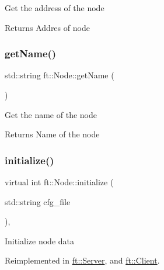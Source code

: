 Get the address of the node

\begin{DoxyReturn}{Returns}
Addres of node 
\end{DoxyReturn}
\mbox{\label{classft_1_1Node_af62312cc4d5a05c859034b10b1a1af64}} 
\subsubsection{\texorpdfstring{get\+Name()}{getName()}}
{\footnotesize\ttfamily std\+::string ft\+::\+Node\+::get\+Name (\begin{DoxyParamCaption}{ }\end{DoxyParamCaption})\hspace{0.3cm}{\ttfamily [inline]}}

Get the name of the node

\begin{DoxyReturn}{Returns}
Name of the node 
\end{DoxyReturn}
\mbox{\label{classft_1_1Node_addc92fd2c5cae12a8ea68c30b7202e91}} 
\subsubsection{\texorpdfstring{initialize()}{initialize()}}
{\footnotesize\ttfamily virtual int ft\+::\+Node\+::initialize (\begin{DoxyParamCaption}\item[{std\+::string}]{cfg\+\_\+file }\end{DoxyParamCaption})\hspace{0.3cm}{\ttfamily [inline]}, {\ttfamily [virtual]}}

Initialize node data 

Reimplemented in \mbox{\hyperlink{classft_1_1Server_a834002a833999b593d357b72ef69ddcf}{ft\+::\+Server}}, and \mbox{\hyperlink{classft_1_1Client_a063db70469c9f2715bbad637d0353680}{ft\+::\+Client}}.

\mbox{\label{classft_1_1Node_af2fde6292b45c9a7e85a8905c8c728cc}} 
